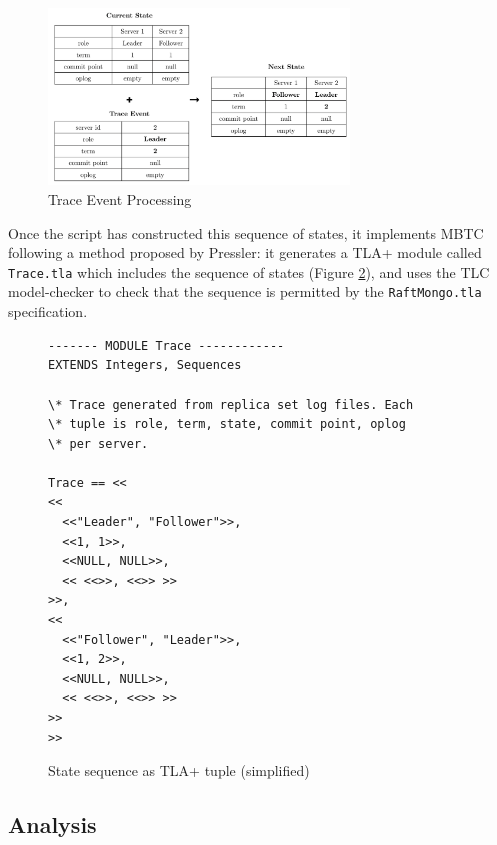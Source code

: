 \documentclass{vldb}
\begin{document}
\begin{figure}
\includegraphics[width=8cm]{event-processing.png}
\caption{Trace Event Processing}
\label{figure:event-processing}
\end{figure}

Once the script has constructed this sequence of states, it implements MBTC following a method proposed by Pressler\cite{Pressler18VerifyingSoftwareTracesTLAPlus}: it generates a TLA+ module called \texttt{Trace.tla} which includes the sequence of states (Figure \ref{fig:state-sequence}), and uses the TLC model-checker to check that the sequence is permitted by the \texttt{RaftMongo.tla} specification.

\begin{figure}
\begin{verbatim}
------- MODULE Trace ------------
EXTENDS Integers, Sequences

\* Trace generated from replica set log files. Each
\* tuple is role, term, state, commit point, oplog
\* per server.

Trace == <<
<<
  <<"Leader", "Follower">>,
  <<1, 1>>,
  <<NULL, NULL>>,
  << <<>>, <<>> >>
>>,
<<
  <<"Follower", "Leader">>,
  <<1, 2>>,
  <<NULL, NULL>>,
  << <<>>, <<>> >>
>>
>>
\end{verbatim}
\caption{State sequence as TLA+ tuple (simplified)}
\label{fig:state-sequence}
\end{figure}

\subsection{Analysis}

\end{document}
